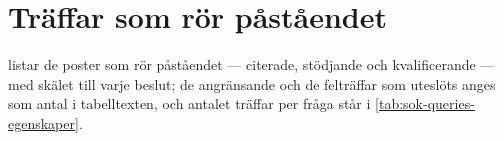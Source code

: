 \section{Träffar som rör påståendet}
\label{sec:egen-traffar}

 listar de poster som rör påståendet ---
citerade, stödjande och kvalificerande --- med skälet till varje beslut;
de angränsande och de felträffar som uteslöts anges som antal i
tabelltexten, och antalet träffar per fråga står i
\cref{tab:sok-queries-egenskaper}.


